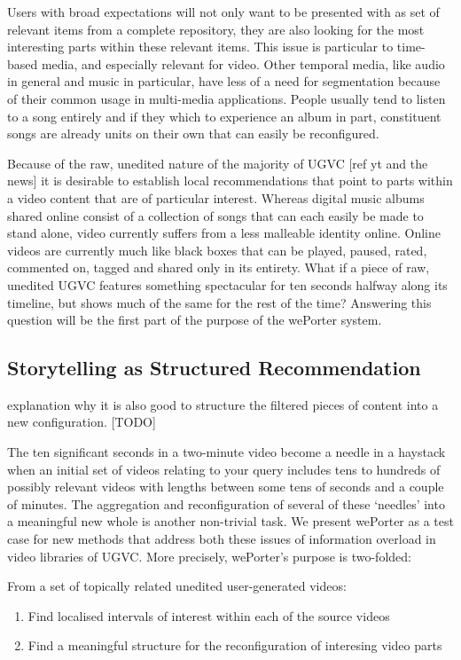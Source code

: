 Users with broad expectations will not only want to be presented with as set of relevant items from a complete repository, they are also looking for the most interesting parts within these relevant items. This issue is particular to time-based media, and especially relevant for video. Other temporal media, like audio in general and music in particular, have less of a need for segmentation because of  their common usage in multi-media applications. People usually tend to listen to a song entirely and if they which to experience an album in part, constituent songs are already units on their own that can easily be reconfigured.

Because of the raw, unedited nature of the majority of UGVC [ref yt and the news] it is desirable to establish local recommendations that point to parts within a video content that are of particular interest. Whereas digital music albums shared online consist of a collection of songs that can each easily be made to stand alone, video currently suffers from a less malleable identity online.  Online videos are currently much like black boxes that can be played, paused, rated, commented on, tagged and shared only in its entirety. What if a piece of raw, unedited UGVC features something spectacular for ten seconds halfway along its timeline, but shows much of the same for the rest of the time? Answering this question will be the first part of the purpose of the wePorter system.

\subsection{Storytelling as Structured Recommendation}

explanation why it is also good to structure the filtered pieces of content into a new configuration.
[TODO]


The ten significant seconds in a two-minute video become a needle in a haystack when an initial set of videos relating to your query includes tens to hundreds of possibly relevant videos with lengths between some tens of seconds and a couple of minutes. The aggregation and reconfiguration of several of these `needles' into a meaningful new whole is another non-trivial task. We present wePorter as a test case for new methods that address both these issues of information overload in video libraries of UGVC. More precisely, wePorter's purpose is two-folded:

From a set of topically related unedited user-generated videos:
\begin{enumerate}
  \item Find localised intervals of interest within each of the source videos
  \item Find a meaningful structure for the reconfiguration of interesing video parts
\end{enumerate}






